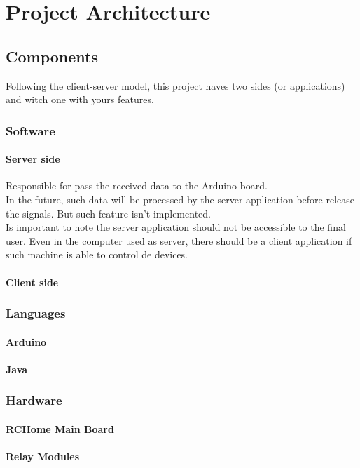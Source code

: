 \chapter{Project Architecture}
\section{Components}
Following the client-server model, this project haves two sides (or
applications) and witch one with yours features.

\subsection{Software}
\subsubsection{Server side}
Responsible for pass the received data to the Arduino board.\\

In the future, such data will be processed by the server application before
release the signals. But such feature isn't implemented.\\

Is important to note the server application should not be accessible to the final
user. Even in the computer used as server, there should be a client application
if such machine is able to control de devices.

\subsubsection{Client side}

\subsection{Languages}
\subsubsection{Arduino}
\subsubsection{Java}
\subsection{Hardware}
\subsubsection{RCHome Main Board}
\subsubsection{Relay Modules}


